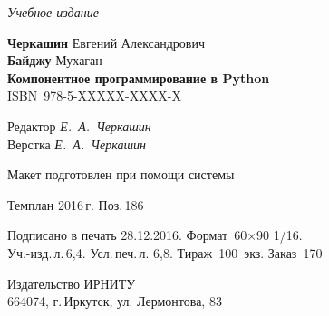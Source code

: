 \documentclass[a4paper,openany,twoside,draft]{book}
\providecommand{\DUadmonition}[2][class-arg]{%
  \ifcsname DUadmonition#1\endcsname%
    \csname DUadmonition#1\endcsname{#2}%
  \else
    \begin{center}
      \fbox{\parbox{0.9\textwidth}{#2}}
    \end{center}
  \fi
}
\providecommand*{\DUtitle}[2][class-arg]{%
  \ifcsname DUtitle#1\endcsname%
    \csname DUtitle#1\endcsname{#2}%
  \else
    \smallskip\noindent\textbf{#2}\smallskip%
  \fi
}
\begin{document}






\newpage
\thispagestyle{empty}
\mbox{}

\vfill\vfill\vfill\vfill

\hfill{}{\small\itshape Учебное издание}
\vspace{4ex}
\begin{center}
{\small\textbf{Черкашин} Евгений Александрович\\}
{\small\textbf{Байджу} Мухаган \\[1em]}
{\bfseries Компонентное программирование в Python}\\[1em]
ISBN~978-5-XXXXX-XXXX-X
\vfill

\small
Редактор \textit{Е.~А.~Черкашин}\\
Верстка \textit{Е.~А.~Черкашин}

\vfill{}
{\small Макет подготовлен при помощи системы \LaTeXsys\\\mbox{}}
\vfill{}

Темплан 2016\,{}г. Поз.\,{}186

\end{center}
\begin{center}\small
\noindent Подписано в печать 28.12.2016.
Формат~60$\times$90 1/16.\\  %
Уч.-изд.\,{}л.\,{}6,4. Усл.\,{}печ.\,{}л. 6,8. Тираж~100~экз. Заказ~170
\end{center}
\vspace{1           ex}
\begin{center}\small
Издательство ИРНИТУ\\{}
664074, г.\,{}Иркутск, ул. Лермонтова, 83 \label{lastpage}
\end{center}
\end{document}
